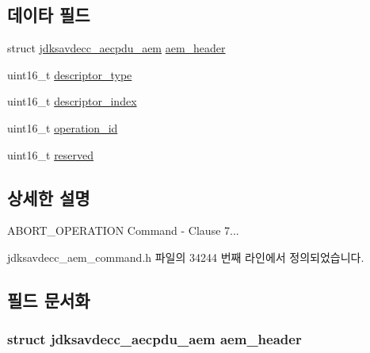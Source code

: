\subsection*{데이타 필드}
\begin{DoxyCompactItemize}
\item 
struct \hyperlink{structjdksavdecc__aecpdu__aem}{jdksavdecc\+\_\+aecpdu\+\_\+aem} \hyperlink{structjdksavdecc__aem__command__abort__operation_ae1e77ccb75ff5021ad923221eab38294}{aem\+\_\+header}
\item 
uint16\+\_\+t \hyperlink{structjdksavdecc__aem__command__abort__operation_ab7c32b6c7131c13d4ea3b7ee2f09b78d}{descriptor\+\_\+type}
\item 
uint16\+\_\+t \hyperlink{structjdksavdecc__aem__command__abort__operation_a042bbc76d835b82d27c1932431ee38d4}{descriptor\+\_\+index}
\item 
uint16\+\_\+t \hyperlink{structjdksavdecc__aem__command__abort__operation_a5b1b19c38a3b340cfc6ebcb9eeb153e2}{operation\+\_\+id}
\item 
uint16\+\_\+t \hyperlink{structjdksavdecc__aem__command__abort__operation_a5a6ed8c04a3db86066924b1a1bf4dad3}{reserved}
\end{DoxyCompactItemize}


\subsection{상세한 설명}
A\+B\+O\+R\+T\+\_\+\+O\+P\+E\+R\+A\+T\+I\+ON Command -\/ Clause 7... 

jdksavdecc\+\_\+aem\+\_\+command.\+h 파일의 34244 번째 라인에서 정의되었습니다.



\subsection{필드 문서화}
\subsubsection[{\texorpdfstring{aem\+\_\+header}{aem_header}}]{\setlength{\rightskip}{0pt plus 5cm}struct {\bf jdksavdecc\+\_\+aecpdu\+\_\+aem} aem\+\_\+header}\hypertarget{structjdksavdecc__aem__command__abort__operation_ae1e77ccb75ff5021ad923221eab38294}{}\label{structjdksavdecc__aem__command__abort__operation_ae1e77ccb75ff5021ad923221eab38294}


